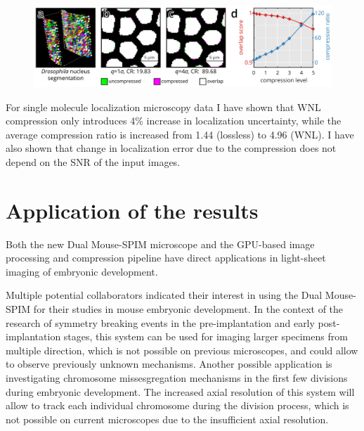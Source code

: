 \documentclass{booklet_style}
\begin{document}
\begin{figure}
  \centering
  \includegraphics[page=1,width=\textwidth]{4_gpu/LLvsB3D}
  \label{fig:wnlDroso}
\end{figure}

For single molecule localization microscopy data I have shown that WNL compression only introduces 4\% increase in localization uncertainty, while the average compression ratio is increased from 1.44 (lossless) to 4.96 (WNL). I have also shown that change in localization error due to the compression does not depend on the SNR of the input images.



\section{Application of the results}
Both the new Dual Mouse-SPIM microscope and the GPU-based image processing and compression pipeline have direct applications in light-sheet imaging of embryonic development.

Multiple potential collaborators indicated their interest in using the Dual Mouse-SPIM for their studies in mouse embryonic development. In the context of the research of symmetry breaking events in the pre-implantation and early post-implantation stages, this system can be used for imaging larger specimens from multiple direction, which is not possible on previous microscopes, and could allow to observe previously unknown mechanisms.
Another possible application is investigating chromosome missesgregation mechanisms in the first few divisions during embryonic development. The increased axial resolution of this system will allow to track each individual chromosome during the division process, which is not possible on current microscopes due to the insufficient axial resolution.
\end{document}
